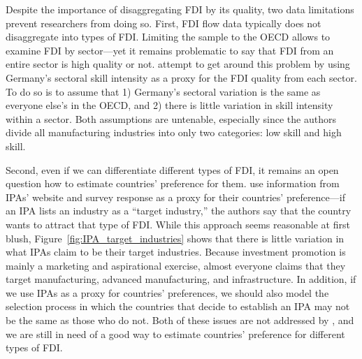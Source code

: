 Despite the importance of disaggregating FDI by its quality, two data
limitations prevent researchers from doing so. First, FDI flow data typically
does not disaggregate into types of FDI. Limiting the sample to the OECD allows
\citet{Alfaro2003} to examine FDI by sector---yet it remains problematic to say
that FDI from an entire sector is high quality or not. \citet{Alfaro2007}
attempt to get around this problem by using Germany's sectoral skill intensity
as a proxy for the FDI quality from each sector. To do so is to assume that 1)
Germany's sectoral variation is the same as everyone else's in the OECD, and 2)
there is little variation in skill intensity within a sector. Both assumptions
are untenable, especially since the authors divide all manufacturing industries
into only two categories: low skill and high skill.

Second, even if we can differentiate different types of FDI, it remains an open
question how to estimate countries' preference for them. \citet{Alfaro2007} use
information from IPAs' website and survey response as a proxy for their
countries' preference---if an IPA lists an industry as a ``target industry,''
the authors say that the country wants to attract that type of FDI. While this
approach seems reasonable at first blush, Figure~\ref{fig:IPA_target_industries}
shows that there is little variation in what IPAs claim to be their target
industries. Because investment promotion is mainly a marketing and aspirational
exercise, almost everyone claims that they target manufacturing, advanced
manufacturing, and infrastructure. In addition, if we use IPAs as a proxy for
countries' preferences, we should also model the selection process in which the
countries that decide to establish an IPA may not be the same as those who do
not. Both of these issues are not addressed by \citep{Alfaro2007}, and we are
still in need of a good way to estimate countries' preference for different
types of FDI.

